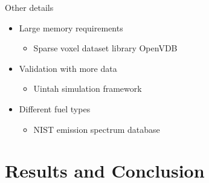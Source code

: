 \documentclass{beamer}
\begin{document}
\begin{frame}{Other details}

\begin{itemize}
\setlength\itemsep{0.5em}
\item Large memory requirements
	\begin{itemize}
	\setlength\itemsep{0.5em}
	\item Sparse voxel dataset library OpenVDB
	\end{itemize}
\item Validation with more data
	\begin{itemize}
	\setlength\itemsep{0.5em}
	\item Uintah simulation framework
	\end{itemize}
\item Different fuel types
	\begin{itemize}
	\setlength\itemsep{0.5em}
	\item NIST emission spectrum database
	\end{itemize}
\end{itemize}

\end{frame}

\section{Results and Conclusion}
\subsection{ }
\end{document}
